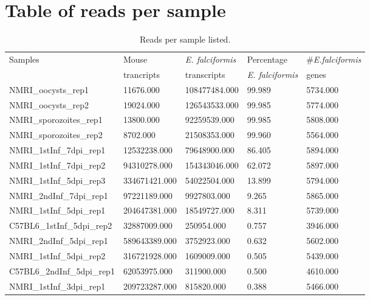 \documentclass{article}
\begin{document}


\section{Table of reads per sample}
\setlength{\tabcolsep}{10pt}
\begin{table}[H]
\centering 
	\caption{Reads per sample listed.}
\begin{tabular}{*5l}    \toprule
Samples  & Mouse 	& \textit{E. falciformis}  & Percentage			& \#\textit{E.falciformis} \\
	& trancripts	& transcripts   	 & \textit{E. falciformis}	& genes \\ \midrule
NMRI\_oocysts\_rep1 & 11676.000 & 108477484.000 & 99.989 & 5734.000 \\ 
NMRI\_oocysts\_rep2 & 19024.000 & 126543533.000 & 99.985 & 5774.000 \\ 
NMRI\_sporozoites\_rep1 & 13800.000 & 92259539.000 & 99.985 & 5808.000 \\ 
NMRI\_sporozoites\_rep2 & 8702.000 & 21508353.000 & 99.960 & 5564.000 \\ 
NMRI\_1stInf\_7dpi\_rep1 & 12532238.000 & 79648900.000 & 86.405 & 5894.000 \\ 
NMRI\_1stInf\_7dpi\_rep2 & 94310278.000 & 154343046.000 & 62.072 & 5897.000 \\ 
NMRI\_1stInf\_5dpi\_rep3 & 334671421.000 & 54022504.000 & 13.899 & 5794.000 \\ 
NMRI\_2ndInf\_7dpi\_rep1 & 97221189.000 & 9927803.000 & 9.265 & 5865.000 \\ 
NMRI\_1stInf\_5dpi\_rep1 & 204647381.000 & 18549727.000 & 8.311 & 5739.000 \\ 
C57BL6\_1stInf\_5dpi\_rep2 & 32887009.000 & 250954.000 & 0.757 & 3946.000 \\ 
	{\color{Gray}NMRI\_2ndInf\_5dpi\_rep1} & {\color{Gray} 589643389.000} & {\color{Gray}3752923.000} & {\color{Gray} 0.632} &  {\color{Gray}5602.000} \\ 
NMRI\_1stInf\_5dpi\_rep2 & 316721928.000 & 1609009.000 & 0.505 & 5439.000 \\ 
C57BL6\_2ndInf\_5dpi\_rep1 & 62053975.000 & 311900.000 & 0.500 & 4610.000 \\ 
	{\color{Gray}NMRI\_1stInf\_3dpi\_rep1} & {\color{Gray}209723287.000} &  {\color{Gray}815820.000} &  {\color{Gray}0.388} &  {\color{Gray}5466.000} \\ 

\end{tabular}
\end{table}
\end{document}
